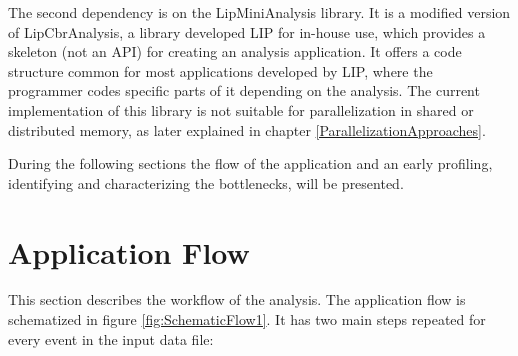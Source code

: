 The second dependency is on the LipMiniAnalysis library. It is a modified version of LipCbrAnalysis, a library developed LIP for in-house use, which provides a skeleton (not an API) for creating an analysis application. It offers a code structure common for most applications developed by LIP, where the programmer codes specific parts of it depending on the analysis. The current implementation of this library is not suitable for parallelization in shared or distributed memory, as later explained in chapter \ref{ParallelizationApproaches}.

During the following sections the flow of the application and an early profiling, identifying and characterizing the bottlenecks, will be presented.

\section{Application Flow}
\label{Application:Flow}

This section describes the workflow of the \tth analysis. The application flow is schematized in figure \ref{fig:SchematicFlow1}. It has two main steps repeated for every event in the input data file: 

